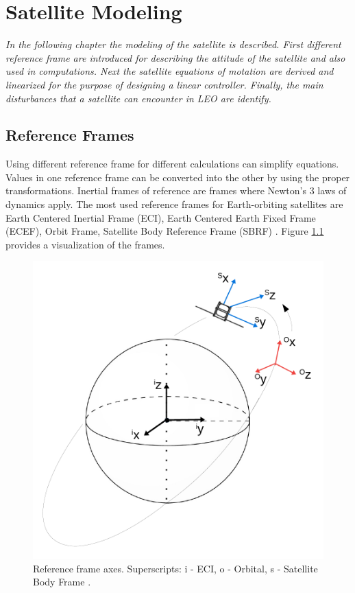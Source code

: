\chapter{Satellite Modeling}
\textit{In the following chapter the modeling of the satellite is described. First different reference frame are introduced for describing the attitude of the satellite and also used in computations. Next the satellite equations of motation are derived and linearized for the purpose of designing a linear controller. Finally, the main disturbances that a satellite can encounter in LEO are identify.}

\section{Reference Frames}


Using different reference frame for different calculations can simplify equations. Values in one reference frame can be converted into the other by using the proper transformations.
Inertial frames of reference are frames where Newton's 3 laws of dynamics apply.
The most used reference frames for Earth-orbiting satellites are Earth Centered Inertial Frame (ECI), Earth Centered Earth Fixed Frame (ECEF), Orbit Frame, Satellite Body Reference Frame (SBRF)  \cite{ref1} \cite{ref2}. Figure \ref{fig:frames} provides a visualization of the frames.

\begin{figure}[h!]
	\centering 
	\includegraphics[width=140mm]{figures/frame.pdf}	
	\caption{Reference frame axes. Superscripts: i - ECI, o - Orbital, s - Satellite Body Frame \cite{our_report}.}
	\label{fig:frames}
\end{figure}

